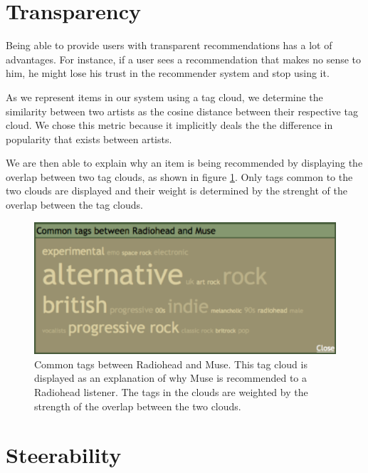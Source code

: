 \documentclass[a4paper,10pt,twocolumn]{article}
\begin{document}
\section{Transparency}

Being able to provide users with transparent recommendations has a lot of advantages. 
For instance, if a user sees a recommendation that makes no sense to him, he might 
lose his trust in the recommender system and stop using it. 

As we represent items in our system using a tag cloud, we determine the similarity 
between two artists as the cosine distance between their respective tag cloud. We chose this 
metric because it implicitly deals the the difference in popularity that exists between artists. 

We are then able to explain why an item is being recommended 
by displaying the overlap between two tag clouds, as shown in figure \ref{fig:commontags}.
Only tags common to the two clouds are displayed and 
their weight is determined by the strenght of the overlap between the tag clouds.

\begin{figure}[ht]
\begin{center}
\includegraphics[width=0.9\columnwidth]{radiohead-muse-commontags}
\end{center}
\caption{Common tags between Radiohead and Muse. This tag cloud is displayed as an 
explanation of why Muse is recommended to a Radiohead listener. The tags in the 
clouds are weighted by the strength of the overlap between the two clouds.}
\label{fig:commontags}
\end{figure}

\section{Steerability}
\label{section:steerable}
\end{document}
